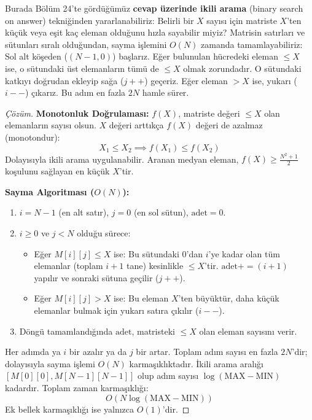 Burada Bölüm 24'te gördüğümüz \textbf{cevap üzerinde ikili arama} (binary search on answer) tekniğinden yararlanabiliriz:
Belirli bir $X$ sayısı için matriste $X$'ten küçük veya eşit kaç eleman olduğunu hızla sayabilir miyiz?
Matrisin satırları ve sütunları sıralı olduğundan, sayma işlemini $O(N)$ zamanda tamamlayabiliriz:
Sol alt köşeden ($(N-1, 0)$) başlarız.
Eğer bulunulan hücredeki eleman $\le X$ ise, o sütundaki üst elemanların tümü de $\le X$ olmak zorundadır. O sütundaki katkıyı doğrudan ekleyip sağa ($j++$) geçeriz.
Eğer eleman $> X$ ise, yukarı ($i--$) çıkarız.
Bu adım en fazla $2N$ hamle sürer.

\begin{proof}[Çözüm]
\textbf{Monotonluk Doğrulaması:}
$f(X)$, matriste değeri $\le X$ olan elemanların sayısı olsun.
$X$ değeri arttıkça $f(X)$ değeri de azalmaz (monotondur):
\[
X_1 \le X_2 \implies f(X_1) \le f(X_2)
\]
Dolayısıyla ikili arama uygulanabilir. Aranan medyan eleman, $f(X) \ge \frac{N^2 + 1}{2}$ koşulunu sağlayan en küçük $X$'tir.

\textbf{Sayma Algoritması ($O(N)$):}
\begin{enumerate}
    \item $i = N - 1$ (en alt satır), $j = 0$ (en sol sütun), $\text{adet} = 0$.
    \item $i \ge 0$ ve $j < N$ olduğu sürece:
    \begin{itemize}
        \item Eğer $M[i][j] \le X$ ise: Bu sütundaki $0$'dan $i$'ye kadar olan tüm elemanlar (toplam $i + 1$ tane) kesinlikle $\le X$'tir. $\text{adet} += (i + 1)$ yapılır ve sonraki sütuna geçilir ($j++$).
        \item Eğer $M[i][j] > X$ ise: Bu eleman $X$'ten büyüktür, daha küçük elemanlar bulmak için yukarı satıra çıkılır ($i--$).
    \end{itemize}
    \item Döngü tamamlandığında $\text{adet}$, matristeki $\le X$ olan eleman sayısını verir.
\end{enumerate}

Her adımda ya $i$ bir azalır ya da $j$ bir artar. Toplam adım sayısı en fazla $2N$'dir; dolayısıyla sayma işlemi $O(N)$ karmaşıklıktadır.
İkili arama aralığı $[M[0][0], M[N-1][N-1]]$ olup adım sayısı $\log(\text{MAX} - \text{MIN})$ kadardır.
Toplam zaman karmaşıklığı:
\[
O(N \log(\text{MAX} - \text{MIN}))
\]
Ek bellek karmaşıklığı ise yalnızca $O(1)$'dir.
\end{proof}

